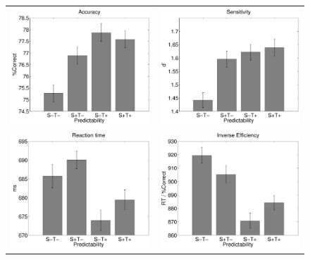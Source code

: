 \documentclass[dwyatte_dissertation.tex]{subfiles}
\begin{document}
\begin{figure}[h!]
\begin{center}
\begin{tabular}{ll}
\includegraphics[width=80mm]{figs/pleast/results_accuracy.pdf} & 
\includegraphics[width=80mm]{figs/pleast/results_dprime.pdf} \\
\includegraphics[width=80mm]{figs/pleast/results_rt.pdf} &
\includegraphics[width=80mm]{figs/pleast/results_ie.pdf} \\

\end{tabular}
\end{center}
\end{figure}
\end{document}
